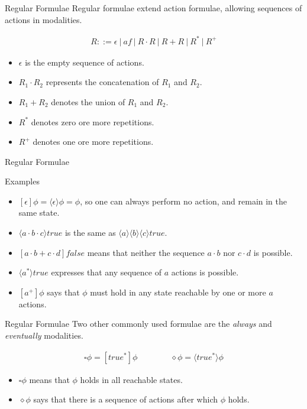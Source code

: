 \documentclass{beamer}
\begin{document}
  \begin{frame}{Regular Formulae}
    Regular formulae extend action formulae, allowing sequences of actions in modalities.

    \begin{align*}
      R ::= \epsilon\ |\ af\ |\ R\cdot{R}\ |\ R+R\ |\ R^*\ |\ R^+
    \end{align*}

    \begin{itemize}
      \item $\epsilon$ is the empty sequence of actions.
      \item $R_1\cdot{R_2}$ represents the concatenation of $R_1$ and $R_2$.
      \item $R_1+R_2$ denotes the union of  $R_1$ and $R_2$.
      \item $R^*$ denotes zero ore more repetitions.
      \item $R^+$ denotes one ore more repetitions.
    \end{itemize}
  \end{frame}

  \begin{frame}{Regular Formulae}
    \begin{exampleblock}{Examples}
      \begin{itemize}
        \item $[\epsilon]\phi = \langle\epsilon\rangle\phi = \phi$, so one can always perform no action, and remain in the same state.
        \item $\langle{a}\cdot{b}\cdot{c}\rangle{true}$ is the same as $\langle{a}\rangle\langle{b}\rangle\langle{c}\rangle{true}$.
        \item $[a\cdot{b} + c\cdot{d}]false$ means that neither the sequence $a\cdot{b}$ nor $c\cdot{d}$ is possible.
        \item $\langle{a^*}\rangle{true}$ expresses that any sequence of $a$ actions is possible.
        \item $[a^+]\phi$ says that $\phi$ must hold in any state reachable by one or more $a$ actions.
      \end{itemize}
    \end{exampleblock}
  \end{frame}

  \begin{frame}{Regular Formulae}
    Two other commonly used formulae are the \textit{always} and \textit{eventually} modalities.

    \begin{align*}
      \square\phi = [true^*]\phi \qquad\qquad    \diamond\phi = \langle{true^*}\rangle\phi
    \end{align*}

    \begin{itemize}
      \item $\square\phi$ means that $\phi$ holds in all reachable states.
      \item $\diamond\phi$ says that there is a sequence of actions after which $\phi$ holds.
    \end{itemize}
  \end{frame}
\end{document}
